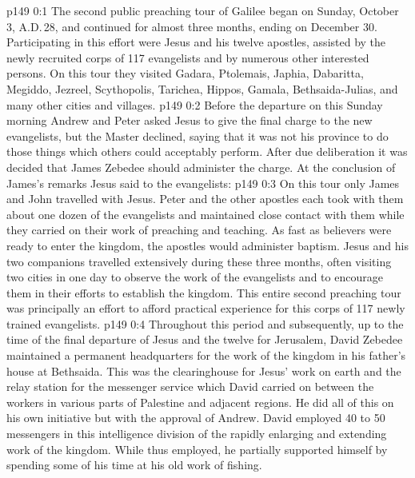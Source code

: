 \author{Midwayer Commission}
\vs p149 0:1 The second public preaching tour of Galilee began on Sunday, October 3, A.D.\,28, and continued for almost three months, ending on December 30. Participating in this effort were Jesus and his twelve apostles, assisted by the newly recruited corps of 117 evangelists and by numerous other interested persons. On this tour they visited Gadara, Ptolemais, Japhia, Dabaritta, Megiddo, Jezreel, Scythopolis, Tarichea, Hippos, Gamala, Bethsaida\hyp{}Julias, and many other cities and villages.
\vs p149 0:2 Before the departure on this Sunday morning Andrew and Peter asked Jesus to give the final charge to the new evangelists, but the Master declined, saying that it was not his province to do those things which others could acceptably perform. After due deliberation it was decided that James Zebedee should administer the charge. At the conclusion of James’s remarks Jesus said to the evangelists: 
\vs p149 0:3 On this tour only James and John travelled with Jesus. Peter and the other apostles each took with them about one dozen of the evangelists and maintained close contact with them while they carried on their work of preaching and teaching. As fast as believers were ready to enter the kingdom, the apostles would administer baptism. Jesus and his two companions travelled extensively during these three months, often visiting two cities in one day to observe the work of the evangelists and to encourage them in their efforts to establish the kingdom. This entire second preaching tour was principally an effort to afford practical experience for this corps of 117 newly trained evangelists.
\vs p149 0:4 \pc Throughout this period and subsequent\-ly, up to the time of the final departure of Jesus and the twelve for Jerusalem, David Zebedee maintained a permanent headquarters for the work of the kingdom in his father’s house at Bethsaida. This was the clearinghouse for Jesus’ work on earth and the relay station for the messenger service which David carried on between the workers in various parts of Palestine and adjacent regions. He did all of this on his own initiative but with the approval of Andrew. David employed 40 to 50 messengers in this intelligence division of the rapidly enlarging and extending work of the kingdom. While thus employed, he partially supported himself by spending some of his time at his old work of fishing.
